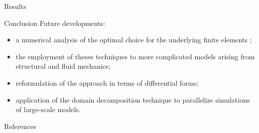 \documentclass[aspectratio=169]{ISAE-Beamer}
\begin{document}
\begin{frame}[fragile]{Results}

\end{frame}



\begin{frame}{Conclusion}
Future developments:
\begin{itemize}
\item a numerical analysis of the optimal choice for the underlying finite elements ;
\item  the employment of theses techniques to more complicated models arising from structural and fluid mechanics;
\item reformulation of the approach in terms of differential forms;
\item application of the domain decomposition technique to parallelize simulations of large-scale models.
\end{itemize}
\vspace{1cm}
\end{frame}

\begin{frame}[allowframebreaks]{References}
\nocite{*}
\printbibliography
\end{frame}
\end{document}
